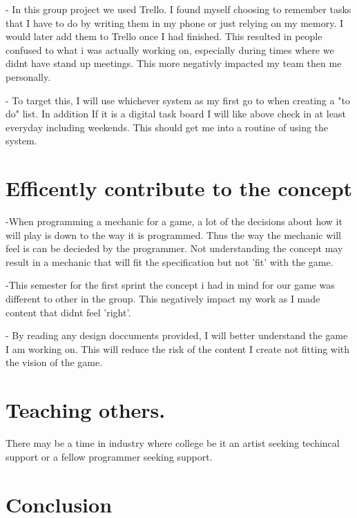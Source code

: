 \documentclass{scrartcl}
\begin{document}
- In this group project we used Trello. I found myself choosing to remember tasks that I have to do by writing them in my phone or just relying on my memory. I would later add them to Trello once I had finished. This resulted in people confused to what i was actually working on, especially during times where we didnt have stand up meetings. This more negativly impacted my team then me personally.

- To target this, I will use whichever system as my first go to when creating a "to do" list. In addition If it is a digital task board I will like above check in at least everyday including weekends. This should get me into a routine of using the system. 


\section{Efficently contribute to the concept}
-When programming a mechanic for a game, a lot of the decisions about how it will play is down to the way it is programmed. Thus the way the mechanic will feel is can be decieded by the programmer.  Not understanding the concept may result in a mechanic that will fit the specification but not 'fit' with the game.

-This semester for the first sprint the concept i had in mind for our game was different to other in the group. This negatively impact my work as I made content that didnt feel 'right'. 

- By reading any design doccuments provided, I will better understand the game I am working on. This will reduce the risk of the content I create not fitting with the vision of the game. 


\section{Teaching others.}
There may be a time in industry where college be it an artist seeking techincal support or a fellow programmer seeking support.


\section{Conclusion}




\end{document}
